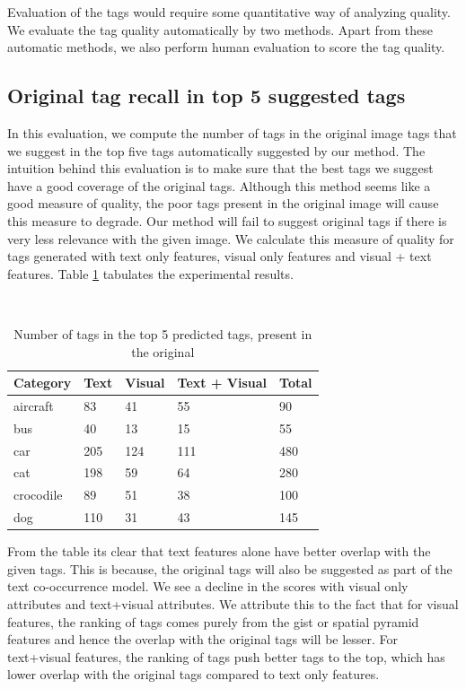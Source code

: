 \documentclass[12pt]{article}
\begin{document}
Evaluation of the tags would require some quantitative way of analyzing quality. We evaluate
the tag quality automatically by two methods. Apart from these automatic methods, we also
perform human evaluation to score the tag quality.

\subsection{Original tag recall in top 5 suggested tags}
In this evaluation, we compute the number of tags in the original image tags that we suggest
in the top five tags automatically suggested by our method. The intuition behind this evaluation
is to make sure that the best tags we suggest have a good coverage of the original tags. Although
this method seems like a good measure of quality, the poor tags present in the original image
will cause this measure to degrade. Our method will fail to suggest original tags if there is
very less relevance with the given image. We calculate this measure of quality for tags generated
with text only features, visual only features and visual + text features. Table \ref{tab:topk} tabulates the
experimental results.


\begin{table}
  \label{tab:topk}
  \caption{Number of tags in the top 5 predicted tags, present in
  the original}
  \begin{center}
    \begin{tabular}{|l l l l l|}
\hline
Category & Text & Visual & Text + Visual & Total \\
\hline
aircraft & 83 & 41 & 55 & 90 \\
bus & 40 & 13 & 15 & 55 \\
car & 205 & 124 & 111 & 480 \\
cat & 198 & 59 & 64 & 280 \\
crocodile & 89 & 51 & 38 & 100 \\
dog & 110 & 31 & 43 & 145 \\
\hline
\end{tabular}
\end{center}
\end{table}

From the table its clear that text features alone have better overlap with the given tags.
This is because, the original tags will also be suggested as part of the text co-occurrence
model. We see a decline in the scores with visual only attributes and text+visual attributes.
We attribute this to the fact that for visual features, the ranking of tags comes purely from
the gist or spatial pyramid features and hence the overlap with the original tags will be lesser.
For text+visual features, the ranking of tags push better tags to the top, which has lower overlap
with the original tags compared to text only features.
\end{document}

